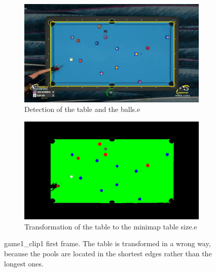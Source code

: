 \begin{figure}[H]
	\centering
	\begin{subfigure}[b]{0.45\textwidth}
		\centering
		\includegraphics[width=\textwidth]{images/TableOrientation/g1_c1.jpg}
		\caption{Detection of the table and the balls.e}
	\end{subfigure}
	\begin{subfigure}[b]{0.45\textwidth}
		\centering
		\includegraphics[width=\textwidth]{images/Segmentation/game1_clip1_segmented_balls_first_frame.jpg}
		\caption{Transformation of the table to the minimap table size.e}
	\end{subfigure}
	\caption{game1\_clip1 first frame. The table is transformed in a wrong way, because the pools are located in the shortest edges rather than the longest ones.}
	\label{fig:game1_clip1_orientation}
\end{figure}


